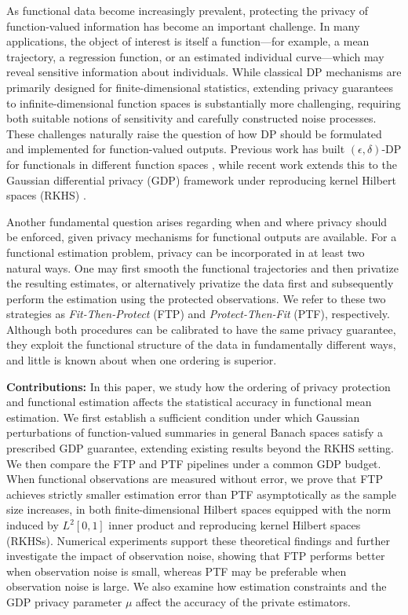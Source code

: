 \documentclass[twoside,11pt]{article}
\begin{document}
As functional data become increasingly prevalent, protecting the privacy of function-valued information has become an important challenge. In many applications, the object of interest is itself a function—for example, a mean trajectory, a regression function, or an estimated individual curve—which may reveal sensitive information about individuals. While classical DP mechanisms are primarily designed for finite-dimensional statistics, extending privacy guarantees to infinite-dimensional function spaces is substantially more challenging, requiring both suitable notions of sensitivity and carefully constructed noise processes. These challenges naturally raise the question of how DP should be formulated and implemented for function-valued outputs. Previous work has built $(\epsilon,\delta)$-DP for functionals in different function spaces \citep{hall2013differential, mirshani2019formal}, while recent work extends this to the Gaussian differential privacy (GDP) framework under reproducing kernel Hilbert spaces (RKHS) \citep{raisa2024noise}.

Another fundamental question arises regarding when and where privacy should be enforced, given privacy mechanisms for functional outputs are available. For a functional estimation problem, privacy can be incorporated in at least two natural ways. One may first smooth the functional trajectories and then privatize the resulting estimates, or alternatively privatize the data first and subsequently perform the estimation using the protected observations. We refer to these two strategies as \emph{Fit-Then-Protect} (FTP) and \emph{Protect-Then-Fit} (PTF), respectively. Although both procedures can be calibrated to have the same privacy guarantee, they exploit the functional structure of the data in fundamentally different ways, and little is known about when one ordering is superior. 

\textbf{Contributions:} In this paper, we study how the ordering of privacy protection and functional estimation affects the statistical accuracy in functional mean estimation. We first establish a sufficient condition under which Gaussian perturbations of function-valued summaries in general Banach spaces satisfy a prescribed GDP guarantee, extending existing results beyond the RKHS setting. We then compare the FTP and PTF pipelines under a common GDP budget. When functional observations are measured without error, we prove that FTP achieves strictly smaller estimation error than PTF asymptotically as the sample size increases, in both finite-dimensional Hilbert spaces equipped with the norm induced by $L^2[0,1]$ inner product and reproducing kernel Hilbert spaces (RKHSs). Numerical experiments support these theoretical findings and further investigate the impact of observation noise, showing that FTP performs better when observation noise is small, whereas PTF may be preferable when observation noise is large. We also examine how estimation constraints and the GDP privacy parameter $\mu$ affect the accuracy of the private estimators.
\end{document}
